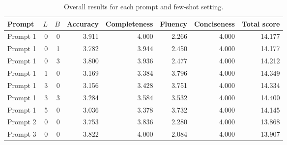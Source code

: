 \begin{table}
\caption{Overall results for each prompt and few-shot setting.}
\begin{tabular}{lrrrrrrr}
\toprule
Prompt & $L$ & $B$ & Accuracy & Completeness & Fluency & Conciseness & Total score \\
\midrule
Prompt 1 & 0 & 0 & 3.911 & 4.000 & 2.266 & 4.000 & 14.177 \\
Prompt 1 & 0 & 1 & 3.782 & 3.944 & 2.450 & 4.000 & 14.177 \\
Prompt 1 & 0 & 3 & 3.800 & 3.936 & 2.477 & 4.000 & 14.212 \\
Prompt 1 & 1 & 0 & 3.169 & 3.384 & 3.796 & 4.000 & 14.349 \\
Prompt 1 & 3 & 0 & 3.156 & 3.428 & 3.751 & 4.000 & 14.334 \\
Prompt 1 & 3 & 3 & 3.284 & 3.584 & 3.532 & 4.000 & 14.400 \\
Prompt 1 & 5 & 0 & 3.036 & 3.378 & 3.732 & 4.000 & 14.145 \\
Prompt 2 & 0 & 0 & 3.753 & 3.836 & 2.280 & 4.000 & 13.868 \\
Prompt 3 & 0 & 0 & 3.822 & 4.000 & 2.084 & 4.000 & 13.907 \\
\bottomrule
\end{tabular}
\end{table}
